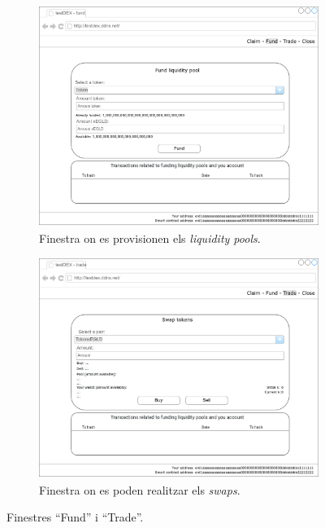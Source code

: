 \documentclass[11pt,a4paper]{article}
\begin{document}
\begin{figure}[!htb]
\begin{subfigure}[b]{0.47\textwidth}
  \includegraphics[width=\linewidth]{screen_fund.png}
  \caption{Finestra on es provisionen els \textit{liquidity pools}.}\label{fig:screenfund}
\end{subfigure}\hfill
\begin{subfigure}[b]{0.47\textwidth}
  \includegraphics[width=\linewidth]{screen_trade.png}
  \caption{Finestra on es poden realitzar els \textit{swaps}.}\label{fig:screentrade}
\end{subfigure}\hfill
\caption{Finestres ``Fund'' i ``Trade''.}
\end{figure}
\end{document}

